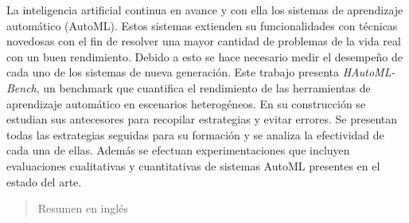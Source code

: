 \begin{resumen}
La inteligencia artificial continua en avance y con ella los sistemas de aprendizaje automático (AutoML). Estos sistemas extienden su 
funcionalidades con técnicas novedosas con el fin de resolver una mayor cantidad de problemas de la vida real con un buen rendimiento.
Debido a esto se hace necesario medir el desempeño de cada uno de los sistemas de nueva generación. Este trabajo presenta \textit{HAutoML-Bench}, un
benchmark que cuantifica el rendimiento de las herramientas de aprendizaje automático en escenarios heterogéneos. En su construcción se estudian sus antecesores
para recopilar estrategias y evitar errores. Se presentan todas las estrategias seguidas para su formación y se analiza la efectividad de cada una de ellas. 
Además se efectuan experimentaciones que incluyen evaluaciones cualitativas y cuantitativas de sistemas AutoML presentes en el estado del arte.

\end{resumen}

\begin{abstract}
	Resumen en inglés
\end{abstract}